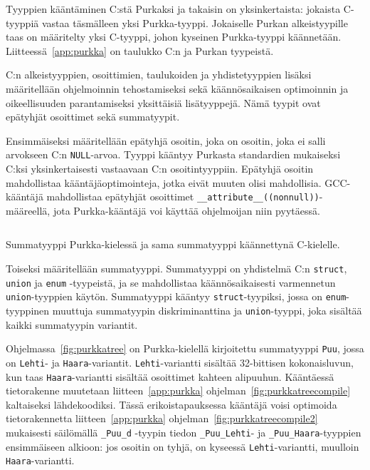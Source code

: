 Tyyppien kääntäminen C:stä Purkaksi ja takaisin on yksinkertaista: jokaista
C-tyyppiä vastaa täsmälleen yksi Purkka-tyyppi. Jokaiselle Purkan
alkeistyypille taas on määritelty yksi C-tyyppi, johon kyseinen Purkka-tyyppi
käännetään. Liitteessä~\ref{app:purkka} on taulukko C:n ja Purkan tyypeistä. 

C:n alkeistyyppien, osoittimien, taulukoiden ja yhdistetyyppien lisäksi
määritellään ohjelmoinnin tehostamiseksi sekä käännösaikaisen optimoinnin ja
oikeellisuuden parantamiseksi yksittäisiä lisätyyppejä. Nämä tyypit ovat
epätyhjät osoittimet sekä summatyypit.

Ensimmäiseksi määritellään epätyhjä osoitin, joka on osoitin, joka ei salli
arvokseen C:n \texttt{NULL}-arvoa. Tyyppi kääntyy Purkasta standardien
mukaiseksi C:ksi yksinkertaisesti vastaavaan C:n osoitintyyppiin. Epätyhjä
osoitin mahdollistaa kääntäjäoptimointeja, jotka eivät muuten olisi
mahdollisia. GCC-kääntäjä mahdollistaa epätyhjät osoittimet
\texttt{\_\_attribute\_\_((nonnull))}-määreellä, jota Purkka-kääntäjä voi
käyttää ohjelmoijan niin pyytäessä.

\begin{listing}[ht!]
    \inputminted{Rust}{koodi/sumtype.prk}
    \caption{Summatyyppi Purkka-kielessä ja sama summatyyppi käännettynä C-kielelle.}
    \label{fig:purkkatree}
\end{listing}

Toiseksi määritellään summatyyppi. Summatyyppi on yhdistelmä C:n
\texttt{struct}, \texttt{union} ja \texttt{enum} -tyypeistä, ja se mahdollistaa
käännösaikaisesti varmennetun \texttt{union}-tyyppien käytön. Summatyyppi kääntyy
\texttt{struct}-tyypiksi, jossa on \texttt{enum}-tyyppinen muuttuja summatyypin
diskriminanttina ja \texttt{union}-tyyppi, joka sisältää kaikki summatyypin
variantit.

Ohjelmassa~\ref{fig:purkkatree} on Purkka-kielellä kirjoitettu summatyyppi
\texttt{Puu}, jossa on \texttt{Lehti}- ja \texttt{Haara}-variantit.
\texttt{Lehti}-variantti sisältää 32-bittisen kokonaisluvun, kun taas
\texttt{Haara}-variantti sisältää osoittimet kahteen alipuuhun. Kääntäessä
tietorakenne muutetaan liitteen~\ref{app:purkka}
ohjelman~\ref{fig:purkkatreecompile} kaltaiseksi lähdekoodiksi. Tässä
erikoistapauksessa kääntäjä voisi optimoida tietorakennetta
liitteen~\ref{app:purkka} ohjelman~\ref{fig:purkkatreecompile2} mukaisesti
säilömällä \texttt{\_Puu\_d} -tyypin tiedon \texttt{\_Puu\_Lehti}- ja
\texttt{\_Puu\_Haara}-tyyppien ensimmäiseen alkioon: jos osoitin on tyhjä, on
kyseessä \texttt{Lehti}-variantti, muulloin \texttt{Haara}-variantti.

